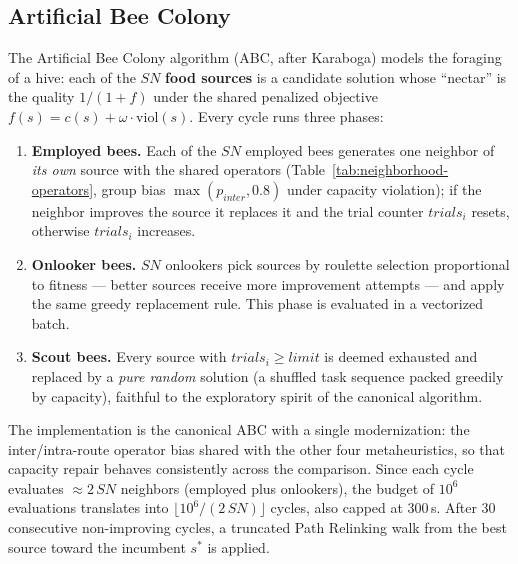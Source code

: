 \subsection{Artificial Bee Colony}
\label{subsec:abc}

The Artificial Bee Colony algorithm (ABC, after Karaboga) models the
foraging of a hive: each of the $SN$ \textbf{food sources} is a candidate
solution whose ``nectar'' is the quality $1/(1 + f)$ under the shared
penalized objective $f(s) = c(s) + \omega \cdot \mathrm{viol}(s)$. Every
cycle runs three phases:

\begin{enumerate}
  \item \textbf{Employed bees.} Each of the $SN$ employed bees generates one
    neighbor of \emph{its own} source with the shared operators
    (Table~\ref{tab:neighborhood-operators}, group bias
    $\max(p_{inter}, 0.8)$ under capacity violation); if the neighbor
    improves the source it replaces it and the trial counter
    $\mathit{trials}_i$ resets, otherwise $\mathit{trials}_i$ increases.
  \item \textbf{Onlooker bees.} $SN$ onlookers pick sources by roulette
    selection proportional to fitness --- better sources receive more
    improvement attempts --- and apply the same greedy replacement rule.
    This phase is evaluated in a vectorized batch.
  \item \textbf{Scout bees.} Every source with $\mathit{trials}_i \geq
    \mathit{limit}$ is deemed exhausted and replaced by a \emph{pure random}
    solution (a shuffled task sequence packed greedily by capacity),
    faithful to the exploratory spirit of the canonical algorithm.
\end{enumerate}

The implementation is the canonical ABC with a single modernization: the
inter/intra-route operator bias shared with the other four metaheuristics,
so that capacity repair behaves consistently across the comparison. Since
each cycle evaluates $\approx 2\,SN$ neighbors (employed plus onlookers),
the budget of $10^6$ evaluations translates into $\lfloor 10^6 / (2\,SN)
\rfloor$ cycles, also capped at 300\,s. After 30 consecutive non-improving
cycles, a truncated Path Relinking walk from the best source toward the
incumbent $s^{*}$ is applied.

